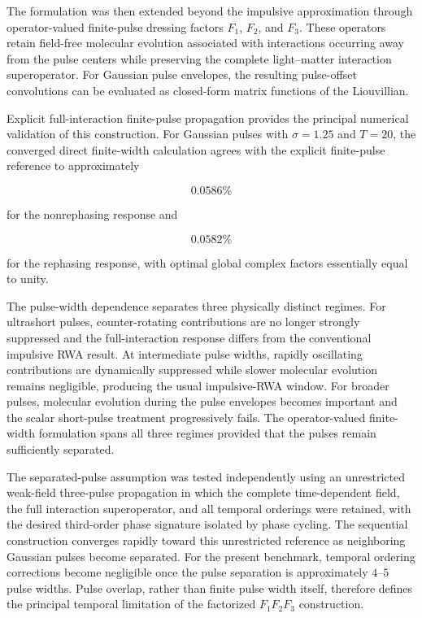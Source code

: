\documentclass[11pt]{article}
\begin{document}
The formulation was then extended beyond the impulsive approximation
through operator-valued finite-pulse dressing factors
$F_1$, $F_2$, and $F_3$. These operators retain field-free molecular
evolution associated with interactions occurring away from the pulse
centers while preserving the complete light--matter interaction
superoperator. For Gaussian pulse envelopes, the resulting
pulse-offset convolutions can be evaluated as closed-form matrix
functions of the Liouvillian.

Explicit full-interaction finite-pulse propagation provides the
principal numerical validation of this construction. For Gaussian
pulses with $\sigma=1.25$ and $T=20$, the converged direct
finite-width calculation agrees with the explicit finite-pulse
reference to approximately

\begin{equation}
0.0586\%
\end{equation}

for the nonrephasing response and

\begin{equation}
0.0582\%
\end{equation}

for the rephasing response, with optimal global complex factors
essentially equal to unity.

The pulse-width dependence separates three physically distinct
regimes. For ultrashort pulses, counter-rotating contributions are no
longer strongly suppressed and the full-interaction response differs
from the conventional impulsive RWA result. At intermediate pulse
widths, rapidly oscillating contributions are dynamically suppressed
while slower molecular evolution remains negligible, producing the
usual impulsive-RWA window. For broader pulses, molecular evolution
during the pulse envelopes becomes important and the scalar
short-pulse treatment progressively fails. The operator-valued
finite-width formulation spans all three regimes provided that the
pulses remain sufficiently separated.

The separated-pulse assumption was tested independently using an
unrestricted weak-field three-pulse propagation in which the complete
time-dependent field, the full interaction superoperator, and all
temporal orderings were retained, with the desired third-order phase
signature isolated by phase cycling. The sequential construction
converges rapidly toward this unrestricted reference as neighboring
Gaussian pulses become separated. For the present benchmark, temporal
ordering corrections become negligible once the pulse separation is
approximately $4$--$5$ pulse widths. Pulse overlap, rather than finite
pulse width itself, therefore defines the principal temporal limitation
of the factorized $F_1F_2F_3$ construction.
\end{document}
